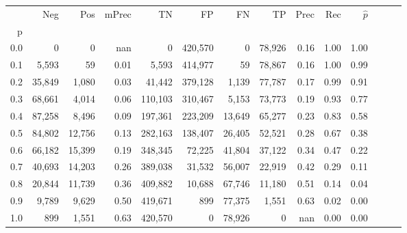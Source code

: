\begin{tabular}{rrrrrrrrrrrrrr}
\toprule
{} &     Neg &     Pos & mPrec &       TN &       FP &      FN &      TP &  Prec &   Rec & $\hat{p}$ \\
p   &         &         &       &          &          &         &         &       &       &           \\
\midrule
0.0 &       0 &       0 &   nan &        0 &  420,570 &       0 &  78,926 &  0.16 &  1.00 &      1.00 \\
0.1 &   5,593 &      59 &  0.01 &    5,593 &  414,977 &      59 &  78,867 &  0.16 &  1.00 &      0.99 \\
0.2 &  35,849 &   1,080 &  0.03 &   41,442 &  379,128 &   1,139 &  77,787 &  0.17 &  0.99 &      0.91 \\
0.3 &  68,661 &   4,014 &  0.06 &  110,103 &  310,467 &   5,153 &  73,773 &  0.19 &  0.93 &      0.77 \\
0.4 &  87,258 &   8,496 &  0.09 &  197,361 &  223,209 &  13,649 &  65,277 &  0.23 &  0.83 &      0.58 \\
0.5 &  84,802 &  12,756 &  0.13 &  282,163 &  138,407 &  26,405 &  52,521 &  0.28 &  0.67 &      0.38 \\
0.6 &  66,182 &  15,399 &  0.19 &  348,345 &   72,225 &  41,804 &  37,122 &  0.34 &  0.47 &      0.22 \\
0.7 &  40,693 &  14,203 &  0.26 &  389,038 &   31,532 &  56,007 &  22,919 &  0.42 &  0.29 &      0.11 \\
0.8 &  20,844 &  11,739 &  0.36 &  409,882 &   10,688 &  67,746 &  11,180 &  0.51 &  0.14 &      0.04 \\
0.9 &   9,789 &   9,629 &  0.50 &  419,671 &      899 &  77,375 &   1,551 &  0.63 &  0.02 &      0.00 \\
1.0 &     899 &   1,551 &  0.63 &  420,570 &        0 &  78,926 &       0 &   nan &  0.00 &      0.00 \\
\bottomrule
\end{tabular}
